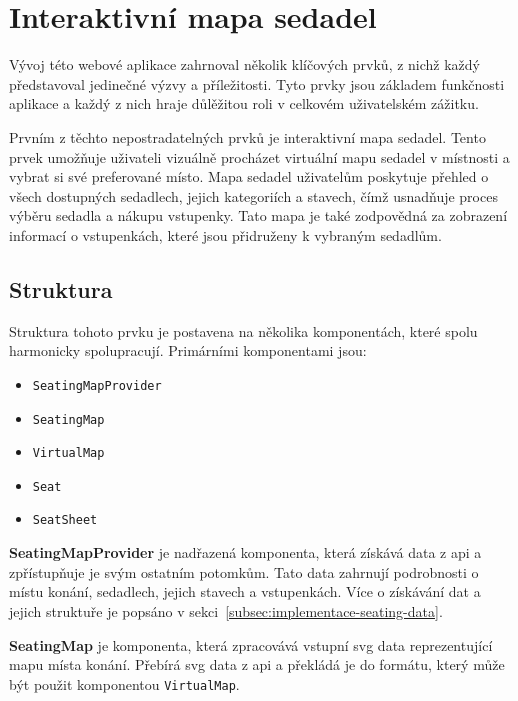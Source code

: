 \section{Interaktivní mapa sedadel}
\label{sec:implementace-seating}
Vývoj této webové aplikace zahrnoval několik klíčových prvků, z nichž každý představoval jedinečné výzvy a příležitosti.
Tyto prvky jsou základem funkčnosti aplikace a každý z nich hraje důlěžitou roli v celkovém uživatelském zážitku.

Prvním z těchto nepostradatelných prvků je interaktivní mapa sedadel.
Tento prvek umožňuje uživateli vizuálně procházet virtuální mapu sedadel v místnosti a vybrat si své preferované místo.
Mapa sedadel uživatelům poskytuje přehled o všech dostupných sedadlech, jejich kategoriích a stavech, čímž usnadňuje proces výběru sedadla a nákupu vstupenky.
Tato mapa je také zodpovědná za zobrazení informací o vstupenkách, které jsou přidruženy k vybraným sedadlům.

\subsection{Struktura}
\label{subsec:implementace-seating-struktura}
Struktura tohoto prvku je postavena na několika komponentách, které spolu harmonicky spolupracují.
Primárními komponentami jsou:

\begin{itemize}
    \item \texttt{SeatingMapProvider}
    \item \texttt{SeatingMap}
    \item \texttt{VirtualMap}
    \item \texttt{Seat}
    \item \texttt{SeatSheet}
\end{itemize}

\textbf{SeatingMapProvider} je nadřazená komponenta, která získává data z \ac{api} a zpřístupňuje je svým ostatním potomkům.
Tato data zahrnují podrobnosti o místu konání, sedadlech, jejich stavech a vstupenkách.
Více o získávání dat a jejich struktuře je popsáno v sekci~\ref{subsec:implementace-seating-data}.

\textbf{SeatingMap} je komponenta, která zpracovává vstupní \ac{svg} data reprezentující mapu místa konání.
Přebírá \ac{svg} data z \ac{api} a překládá je do formátu, který může být použit komponentou \texttt{VirtualMap}.

